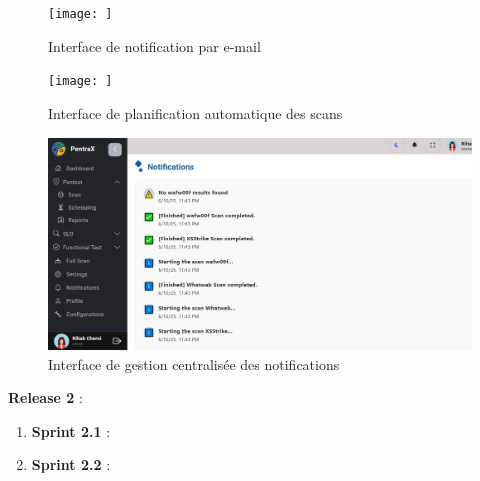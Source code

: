 \begin{justify}
\begin{enumerate}[label=\Alph*.]
                    \begin{figure}[H]
                        \centering
                        \texttt{[image: ]}
                        \caption{Interface de notification par e-mail}
                        \label{fig:interface_email_notification}
                    \end{figure}
                        
                    \begin{figure}[H]
                        \centering
                        \texttt{[image: ]}
                        \caption{Interface de planification automatique des scans}
                        \label{fig:interface_planification_scan}
                    \end{figure}
                        
                    \begin{figure}[H]
                        \centering
                        \includegraphics[width=\textwidth]{chapitres/ch3Sp1/section/sprint2/img/interface/Notifications.PNG}
                        \caption{Interface de gestion centralisée des notifications}
                        \label{fig:interface_notifications_config}
                    \end{figure}
    
    
    
    
                
            \end{enumerate}

    \textbf{\fontsize{16}{19}\selectfont  Release 2} :\\
            \begin{enumerate}[label=\Alph*]
                \item \textbf{Sprint 2.1} :
                \item \textbf{Sprint 2.2} :
            \end{enumerate}
    \end{justify}


